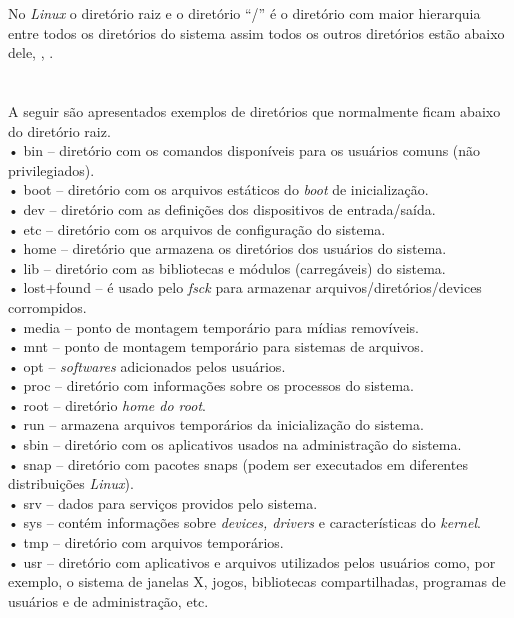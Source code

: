 No \emph{Linux} o diretório raiz e o diretório “/” é o diretório com maior hierarquia entre todos os diretórios do sistema assim todos os outros diretórios estão abaixo dele\cite{Morimoto2011}, \cite{guialinux2020}, \cite{luciano2015}.\\ \\
\\A seguir são apresentados exemplos de diretórios que normalmente ficam abaixo do diretório raiz.\\
•	bin – diretório com os comandos disponíveis para os usuários comuns (não privilegiados).\\
•	boot – diretório com os arquivos estáticos do \emph{boot} de inicialização.\\
•	dev – diretório com as definições dos dispositivos de entrada/saída.\\
•	etc – diretório com os arquivos de configuração do sistema.\\
•	home – diretório que armazena os diretórios dos usuários do sistema.\\
•	lib – diretório com as bibliotecas e módulos (carregáveis) do sistema.\\
•	lost+found – é usado pelo \emph{fsck} para armazenar arquivos/diretórios/devices corrompidos.\\
•	media – ponto de montagem temporário para mídias removíveis.\\
•	mnt – ponto de montagem temporário para sistemas de arquivos.\\
•	opt – \emph{softwares} adicionados pelos usuários.\\
•	proc – diretório com informações sobre os processos do sistema.\\
•	root – diretório \emph{home do root}.\\
•	run – armazena arquivos temporários da inicialização do sistema.\\
•	sbin – diretório com os aplicativos usados na administração do sistema.\\
•	snap – diretório com pacotes snaps (podem ser executados em diferentes distribuições \emph{Linux}).\\
•	srv – dados para serviços providos pelo sistema.\\
•	sys – contém informações sobre \emph{devices, drivers} e características do \emph{kernel}.\\
•	tmp – diretório com arquivos temporários.\\
•	usr – diretório com aplicativos e arquivos utilizados pelos usuários como, por exemplo, o sistema de janelas X, jogos, bibliotecas compartilhadas, programas de usuários e de administração, etc.\\
